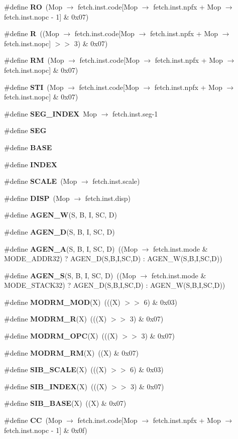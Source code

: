 \begin{CompactItemize}
\item 
\#define {\bf RO}~(Mop $\rightarrow$ fetch.inst.code[Mop $\rightarrow$ fetch.inst.npfx + Mop $\rightarrow$ fetch.inst.nopc - 1] \& 0x07)
\item 
\#define {\bf R}~((Mop $\rightarrow$ fetch.inst.code[Mop $\rightarrow$ fetch.inst.npfx + Mop $\rightarrow$ fetch.inst.nopc] $>$$>$ 3) \& 0x07)
\item 
\#define {\bf RM}~(Mop $\rightarrow$ fetch.inst.code[Mop $\rightarrow$ fetch.inst.npfx + Mop $\rightarrow$ fetch.inst.nopc] \& 0x07)
\item 
\#define {\bf STI}~(Mop $\rightarrow$ fetch.inst.code[Mop $\rightarrow$ fetch.inst.npfx + Mop $\rightarrow$ fetch.inst.nopc] \& 0x07)
\item 
\#define {\bf SEG\_\-INDEX}~Mop $\rightarrow$ fetch.inst.seg-1
\item 
\#define {\bf SEG}
\item 
\#define {\bf BASE}
\item 
\#define {\bf INDEX}
\item 
\#define {\bf SCALE}~(Mop $\rightarrow$ fetch.inst.scale)
\item 
\#define {\bf DISP}~(Mop $\rightarrow$ fetch.inst.disp)
\item 
\#define {\bf AGEN\_\-W}(S, B, I, SC, D)
\item 
\#define {\bf AGEN\_\-D}(S, B, I, SC, D)
\item 
\#define {\bf AGEN\_\-A}(S, B, I, SC, D)~((Mop $\rightarrow$ fetch.inst.mode \& MODE\_\-ADDR32) ? AGEN\_\-D(S,B,I,SC,D) : AGEN\_\-W(S,B,I,SC,D))
\item 
\#define {\bf AGEN\_\-S}(S, B, I, SC, D)~((Mop $\rightarrow$ fetch.inst.mode \& MODE\_\-STACK32) ? AGEN\_\-D(S,B,I,SC,D) : AGEN\_\-W(S,B,I,SC,D))
\item 
\#define {\bf MODRM\_\-MOD}(X)~(((X) $>$$>$ 6) \& 0x03)
\item 
\#define {\bf MODRM\_\-R}(X)~(((X) $>$$>$ 3) \& 0x07)
\item 
\#define {\bf MODRM\_\-OPC}(X)~(((X) $>$$>$ 3) \& 0x07)
\item 
\#define {\bf MODRM\_\-RM}(X)~((X) \& 0x07)
\item 
\#define {\bf SIB\_\-SCALE}(X)~(((X) $>$$>$ 6) \& 0x03)
\item 
\#define {\bf SIB\_\-INDEX}(X)~(((X) $>$$>$ 3) \& 0x07)
\item 
\#define {\bf SIB\_\-BASE}(X)~((X) \& 0x07)
\item 
\#define {\bf CC}~(Mop $\rightarrow$ fetch.inst.code[Mop $\rightarrow$ fetch.inst.npfx + Mop $\rightarrow$ fetch.inst.nopc - 1] \& 0x0f)

\end{CompactItemize}
